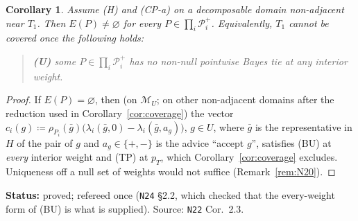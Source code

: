\documentclass[11pt]{article}
\newtheorem{corollary}[theorem]{Corollary}
\theoremstyle{definition}
\theoremstyle{remark}
\newcommand{\M}{\mathcal M}
\newcommand{\src}[1]{\texttt{#1}}
\newcommand{\status}[1]{\par\smallskip\noindent\textbf{Status:} #1\par\smallskip}
\begin{document}
\begin{corollary}\label{cor:residual}
Assume (H) and (CP-a) on a decomposable domain non-adjacent near $T_1$. Then $E(P)\ne\varnothing$ for every $P\in\prod_i\mathcal P^+_i$. Equivalently, $T_1$ cannot be covered once the following holds:
\begin{quote}
\textbf{(U)} some $P\in\prod_i\mathcal P^+_i$ has no non-null pointwise Bayes tie at any interior weight.
\end{quote}
\end{corollary}
\begin{proof}
If $E(P)=\varnothing$, then (on $\M_U$; on other non-adjacent domains after the reduction used in Corollary~\ref{cor:coverage}) the vector $c_i(g)\coloneqq\rho_{P_i}(\bar g)\bigl(\lambda_i(\bar g,0)-\lambda_i(\bar g,a_g)\bigr)$, $g\in U$, where $\bar g$ is the representative in $H$ of the pair of $g$ and $a_g\in\{+,-\}$ is the advice ``accept $g$'', satisfies (BU) at \emph{every} interior weight and (TP) at $p_T$, which Corollary~\ref{cor:coverage} excludes. Uniqueness off a null set of weights would not suffice (Remark~\ref{rem:N20}).
\end{proof}
\status{proved; refereed once (\src{N24} \S2.2, which checked that the every-weight form of (BU) is what is supplied). Source: \src{N22} Cor.~2.3.}
\end{document}
